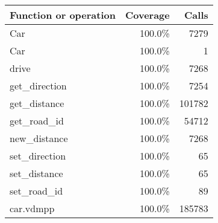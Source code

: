 \documentclass[a4paper]{article}
\begin{document}
\begin{longtable}{|l|r|r|}
\hline
Function or operation & Coverage & Calls \\
\hline
\hline
Car & 100.0\% & 7279 \\
\hline
Car & 100.0\% & 1 \\
\hline
drive & 100.0\% & 7268 \\
\hline
get\_direction & 100.0\% & 7254 \\
\hline
get\_distance & 100.0\% & 101782 \\
\hline
get\_road\_id & 100.0\% & 54712 \\
\hline
new\_distance & 100.0\% & 7268 \\
\hline
set\_direction & 100.0\% & 65 \\
\hline
set\_distance & 100.0\% & 65 \\
\hline
set\_road\_id & 100.0\% & 89 \\
\hline
\hline
car.vdmpp & 100.0\% & 185783 \\
\hline
\end{longtable}
\end{document}
